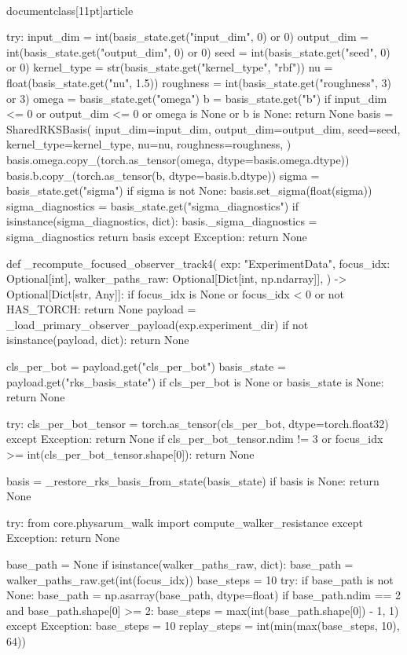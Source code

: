 \\documentclass[11pt]{article}
\begin{document}
\begin{CodeBlock}
    try:
        input_dim = int(basis_state.get("input_dim", 0) or 0)
        output_dim = int(basis_state.get("output_dim", 0) or 0)
        seed = int(basis_state.get("seed", 0) or 0)
        kernel_type = str(basis_state.get("kernel_type", "rbf"))
        nu = float(basis_state.get("nu", 1.5))
        roughness = int(basis_state.get("roughness", 3) or 3)
        omega = basis_state.get("omega")
        b = basis_state.get("b")
        if input_dim <= 0 or output_dim <= 0 or omega is None or b is None:
            return None
        basis = SharedRKSBasis(
            input_dim=input_dim,
            output_dim=output_dim,
            seed=seed,
            kernel_type=kernel_type,
            nu=nu,
            roughness=roughness,
        )
        basis.omega.copy_(torch.as_tensor(omega, dtype=basis.omega.dtype))
        basis.b.copy_(torch.as_tensor(b, dtype=basis.b.dtype))
        sigma = basis_state.get("sigma")
        if sigma is not None:
            basis.set_sigma(float(sigma))
        sigma_diagnostics = basis_state.get("sigma_diagnostics")
        if isinstance(sigma_diagnostics, dict):
            basis._sigma_diagnostics = sigma_diagnostics
        return basis
    except Exception:
        return None


def _recompute_focused_observer_track4(
    exp: "ExperimentData",
    focus_idx: Optional[int],
    walker_paths_raw: Optional[Dict[int, np.ndarray]],
) -> Optional[Dict[str, Any]]:
    if focus_idx is None or focus_idx < 0 or not HAS_TORCH:
        return None
    payload = _load_primary_observer_payload(exp.experiment_dir)
    if not isinstance(payload, dict):
        return None

    cls_per_bot = payload.get("cls_per_bot")
    basis_state = payload.get("rks_basis_state")
    if cls_per_bot is None or basis_state is None:
        return None

    try:
        cls_per_bot_tensor = torch.as_tensor(cls_per_bot, dtype=torch.float32)
    except Exception:
        return None
    if cls_per_bot_tensor.ndim != 3 or focus_idx >= int(cls_per_bot_tensor.shape[0]):
        return None

    basis = _restore_rks_basis_from_state(basis_state)
    if basis is None:
        return None

    try:
        from core.physarum_walk import compute_walker_resistance
    except Exception:
        return None

    base_path = None
    if isinstance(walker_paths_raw, dict):
        base_path = walker_paths_raw.get(int(focus_idx))
    base_steps = 10
    try:
        if base_path is not None:
            base_path = np.asarray(base_path, dtype=float)
            if base_path.ndim == 2 and base_path.shape[0] >= 2:
                base_steps = max(int(base_path.shape[0]) - 1, 1)
    except Exception:
        base_steps = 10
    replay_steps = int(min(max(base_steps, 10), 64))


\end{CodeBlock}
\end{document}
